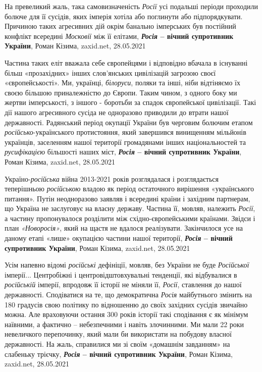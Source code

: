 На превеликий жаль, така самовизначеність \emph{Росії} усі подальші періоди проходили
болюче для її сусідів, яких імперія хотіла або поглинути або підпорядкувати.
Причиною таких агресивних дій окрім банально імперських був постійний конфлікт
всередині \emph{Московії} між її елітами,
\textbf{\emph{Росія} – вічний супротивник України}, Роман Кізима, zaxid.net, 28.05.2021

Частина таких еліт вважала себе європейцями і відповідно вбачала в існуванні
більш «прозахідних» інших слов'янських цивілізацій загрозою своєї
«європейськості». Ми, українці, \emph{білоруси}, поляки та інші, ніби відтіняємо їх
своєю більшою приналежністю до Європи. Таким чином, з одного боку ми жертви
імперськості, з іншого - боротьби за спадок європейської цивілізації. Такі дії
нашого агресивного сусіда не одноразово приводили до втрати нашої державності.
Радянський період окупації України був черговим болючим етапом
\emph{російсько}-українського протистояння, який завершився винищенням мільйонів
українців, заселенням нашої території громадянами інших національностей та
\emph{русифікацією} більшості наших міст,
\textbf{\emph{Росія} – вічний супротивник України}, Роман Кізима, zaxid.net, 28.05.2021

Україно-\emph{російська} війна 2013-2021 років розглядалася і розглядається
теперішньою \emph{російською} владою як період остаточного вирішення «українського
питання». Путін неодноразово заявляв і всередині країни і західним партнерам,
що Україна не заслуговує на власну державу. Частина її, мовляв, належить
\emph{Росії}, а частину пропонувалося розділити між східно-європейськими країнами.
Звідси і план \emph{«Новоросія»}, який на щастя не вдалося реалізувати. Закінчилося
усе на даному етапі «лише» окупацією частини нашої території,
\textbf{\emph{Росія} – вічний супротивник України}, Роман Кізима, zaxid.net, 28.05.2021

Усім напевно відомі \emph{російські} дефініції, мовляв, без України не буде \emph{Російської}
імперії... Центробіжні і центровідштовхувальні тенденції, які відбувалися в
\emph{російській} імперії, впродовж її історії не міняли її, \emph{Росії}, ставлення до нашої
державності. Сподіватися на те, що демократична \emph{Росія} майбутнього змінить на
180 градусів свою політику по відношенню до своїх західних сусідів звичайно
можна. Але враховуючи остання 300 років історії такі сподівання є як мінімум
наївними, а фактично – небезпечними і навіть злочинними. Ми мали 22 роки
невеличкого перепочинку, який мали би використати на побудову власної
державності. На жаль, справилися ми зі своїм «домашнім завданням» на слабеньку
трієчку,
\textbf{\emph{Росія} – вічний супротивник України}, Роман Кізима, zaxid.net, 28.05.2021

